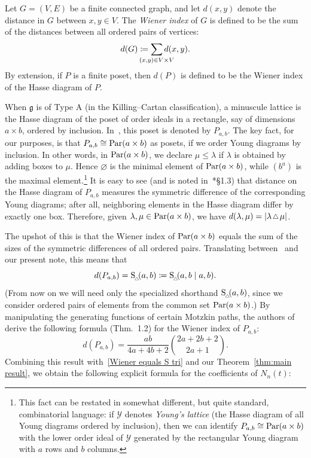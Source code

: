 \documentclass[11pt]{amsart}
\theoremstyle{plain}
\theoremstyle{definition}
\numberwithin{equation}{section}
\newcommand{\Par}{{\rm Par}}
\newcommand{\smtriangle}{\scalebox{.8}{$\,\triangle\,$}}
\newcommand{\Stri}{{\rm S}_{_{\!\triangle\!\!}}}
\begin{document}
Let $G = (V,E)$ be a finite connected graph, and let $d(x,y)$ denote the distance in $G$ between $x,y \in V$.
The \emph{Wiener index} of $G$ is defined to be the sum of the distances between all ordered pairs of vertices:
\[
d(G) \coloneqq \sum_{\mathclap{(x,y) \in V \times V}} d(x,y).
\]
By extension, if $P$ is a finite poset, then $d(P)$ is defined to be the Wiener index of the Hasse diagram of $P$.

When $\mathfrak{g}$ is of Type A (in the Killing--Cartan classification), a minuscule lattice is the Hasse diagram of the poset of order ideals in a rectangle, say of dimensions $a \times b$, ordered by inclusion.
In~\cite{Defant}, this poset is denoted by $P_{a,b}$.
The key fact, for our purposes, is that $P_{a,b} \cong \Par(a \times b)$ as posets, if we order Young diagrams by inclusion.
In other words, in $\Par(a \times b)$, we declare $\mu \leq \lambda$ if $\lambda$ is obtained by adding boxes to $\mu$.
Hence $\varnothing$ is the minimal element of $\Par(a \times b)$, while $(b^a)$ is the maximal element.\footnote{This fact can be restated in somewhat different, but quite standard, combinatorial language:
if $\mathcal{Y}$ denotes \emph{Young's lattice} (the Hasse diagram of all Young diagrams ordered by inclusion), then we can identify $P_{a,b} \cong \Par(a \times b)$ with the lower order ideal of $\mathcal{Y}$ generated by the rectangular Young diagram with $a$ rows and $b$ columns.}
It is easy to see (and is noted in~\cite{Defant}*{\S1.3}) that distance on the Hasse diagram of $P_{a,b}$ measures the symmetric difference of the corresponding Young diagrams;
after all, neighboring elements in the Hasse diagram differ by exactly one box.
Therefore, given $\lambda,\mu \in \Par(a \times b)$, we have $d(\lambda,\mu) = |\lambda \smtriangle \mu|$.

The upshot of this is that the Wiener index of $\Par(a \times b)$ equals the sum of the sizes of the symmetric differences of all ordered pairs.
Translating between~\cite{Defant} and our present note, this means that
\begin{equation}
    \label{Wiener equals S tri}
    d(P_{a,b}) = \Stri(a,b) \coloneqq \Stri(a,b \mid a,b).
\end{equation}
(From now on we will need only the specialized shorthand $\Stri(a, b)$, since we consider ordered pairs of elements from the common set $\Par(a \times b)$.)
By manipulating the generating functions of certain Motzkin paths, the authors of~\cite{Defant} derive the following formula (Thm.~1.2) for the Wiener index of $P_{a,b}$:
\begin{equation}
    \label{Wiener index of Pab}
    d(P_{a,b}) = \frac{ab}{4a + 4b + 2} \binom{2a+2b+2}{2a+1}.
\end{equation}
Combining this result with~\eqref{Wiener equals S tri} and our Theorem~\ref{thm:main result}, we obtain the following explicit formula for the coefficients of $N_n(t)$:
\end{document}

